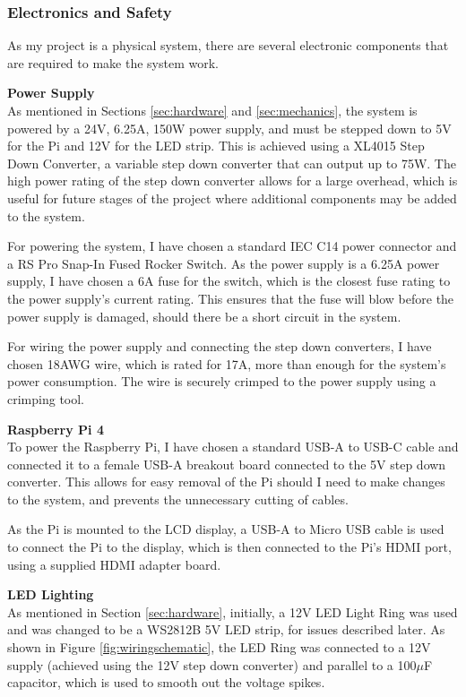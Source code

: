 \subsubsection{Electronics and Safety}
As my project is a physical system, there are several electronic components that are required to make the system work.

\noindent
\textbf{Power Supply} \\
As mentioned in Sections \ref*{sec:hardware} and \ref*{sec:mechanics}, the system is powered by a 24V, 6.25A, 150W power supply, and must
be stepped down to 5V for the Pi and 12V for the LED strip. This is achieved using a XL4015 Step Down Converter\cite{xl4015}, a variable
step down converter that can output up to 75W.
The high power rating of the step down converter allows for a large overhead, which is useful for future stages of the project where 
additional components may be added to the system.

For powering the system, I have chosen a standard IEC C14 power connector and a RS Pro Snap-In Fused Rocker Switch\cite{rsproc14switch}.
As the power supply is a 6.25A power supply, I have chosen a 6A fuse for the switch, which is the closest fuse rating to the power supply's
current rating. This ensures that the fuse will blow before the power supply is damaged, should there be a short circuit in the system.

For wiring the power supply and connecting the step down converters, I have chosen 18AWG wire, which is rated for 17A\cite{18awgwire}, 
more than enough for the system's power consumption. The wire is securely crimped to the power supply using a crimping tool.

\noindent
\textbf{Raspberry Pi 4} \\
To power the Raspberry Pi, I have chosen a standard USB-A to USB-C cable and connected it to a female USB-A breakout board connected to the
5V step down converter. This allows for easy removal of the Pi should I need to make changes to the system, and prevents the unnecessary
cutting of cables.

As the Pi is mounted to the LCD display, a USB-A to Micro USB cable is used to connect the Pi to the display, which is then connected to the
Pi's HDMI port, using a supplied HDMI adapter board.

\noindent
\textbf{LED Lighting} \\
As mentioned in Section \ref*{sec:hardware}, initially, a 12V LED Light Ring was used and was changed to be a WS2812B 5V LED strip, for issues described 
later. As shown in Figure \ref*{fig:wiringschematic}, the LED Ring was connected to a 12V supply (achieved using the 12V step down converter) and
parallel to a 100$\mu$F capacitor, which is used to smooth out the voltage spikes.

